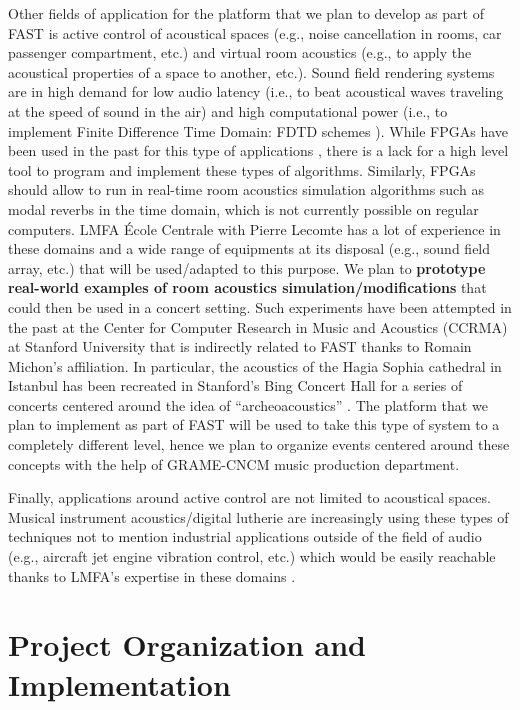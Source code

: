 \documentclass[a4paper,10pt]{article}
\newcommand{\PP}{FAST}
\begin{document}
Other fields of application for the platform that we plan to develop as part of \PP{} is active control of acoustical spaces (e.g., noise cancellation in rooms, car passenger compartment, etc.) and virtual room acoustics (e.g., to apply the acoustical properties of a space to another, etc.). Sound field rendering systems are in high demand for low audio latency (i.e., to beat acoustical waves traveling at the speed of sound in the air) and high computational power (i.e., to implement Finite Difference Time Domain: FDTD schemes \cite{Bilbao2009}). While FPGAs have been used in the past for this type of applications \cite{Tan2019}, there is a lack for a high level tool to program and implement these types of algorithms. Similarly, FPGAs should allow to run in real-time room acoustics simulation algorithms such as modal reverbs \cite{Abel2019} in the time domain, which is not currently possible on regular computers. LMFA École Centrale with Pierre Lecomte has a lot of experience in these domains and a wide range of equipments at its disposal (e.g., sound field array, etc.) that will be used/adapted to this purpose. We plan to \textbf{prototype real-world examples of room acoustics simulation/modifications} that could then be used in a concert setting. Such experiments have been attempted in the past at the Center for Computer Research in Music and Acoustics (CCRMA) at Stanford University that is indirectly related to \PP{} thanks to Romain Michon's affiliation. In particular, the acoustics of the Hagia Sophia cathedral in Istanbul has been recreated in Stanford's Bing Concert Hall for a series of concerts centered around the idea of ``archeoacoustics'' \cite{Abel2009}. The platform that we plan to implement as part of \PP{} will be used to take this type of system to a completely different level, hence we plan to organize events centered around these concepts with the help of GRAME-CNCM music production department.

Finally, applications around active control are not limited to acoustical spaces. Musical instrument acoustics/digital lutherie are increasingly using these types of techniques \cite{Zhang2018} not to mention industrial applications outside of the field of audio (e.g., aircraft jet engine vibration control, etc.) which would be easily reachable thanks to LMFA's expertise in these domains \cite{salze2019new}.

\section*{Project Organization and Implementation}
\end{document}
